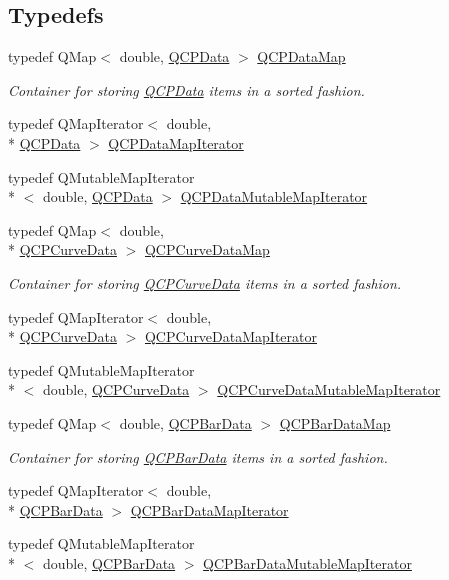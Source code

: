 \subsection*{Typedefs}
\begin{DoxyCompactItemize}
\item 
typedef Q\+Map$<$ double, \hyperlink{a00030_d2/d94/a00184}{Q\+C\+P\+Data} $>$ \hyperlink{a00116_a84a9c4a4c2216ccfdcb5f3067cda76e3}{Q\+C\+P\+Data\+Map}
\begin{DoxyCompactList}\small\item\em Container for storing \hyperlink{a00030_d2/d94/a00184}{Q\+C\+P\+Data} items in a sorted fashion. \end{DoxyCompactList}\item 
typedef Q\+Map\+Iterator$<$ double, \\*
\hyperlink{a00030_d2/d94/a00184}{Q\+C\+P\+Data} $>$ \hyperlink{a00116_a0fd9a83e0a1783a82f439b0e200b6ae5}{Q\+C\+P\+Data\+Map\+Iterator}
\item 
typedef Q\+Mutable\+Map\+Iterator\\*
$<$ double, \hyperlink{a00030_d2/d94/a00184}{Q\+C\+P\+Data} $>$ \hyperlink{a00116_a4798b07422d0d4c46a8665c23958b0ea}{Q\+C\+P\+Data\+Mutable\+Map\+Iterator}
\item 
typedef Q\+Map$<$ double, \\*
\hyperlink{a00029}{Q\+C\+P\+Curve\+Data} $>$ \hyperlink{a00116_a444d37ec9cb2951b3a7fe443c34d1658}{Q\+C\+P\+Curve\+Data\+Map}
\begin{DoxyCompactList}\small\item\em Container for storing \hyperlink{a00029}{Q\+C\+P\+Curve\+Data} items in a sorted fashion. \end{DoxyCompactList}\item 
typedef Q\+Map\+Iterator$<$ double, \\*
\hyperlink{a00029}{Q\+C\+P\+Curve\+Data} $>$ \hyperlink{a00116_aeb3dbc9f09e8ce9957be86dd6e8c803d}{Q\+C\+P\+Curve\+Data\+Map\+Iterator}
\item 
typedef Q\+Mutable\+Map\+Iterator\\*
$<$ double, \hyperlink{a00029}{Q\+C\+P\+Curve\+Data} $>$ \hyperlink{a00116_ad85cf567575500cc8877fd65f4c5b9fb}{Q\+C\+P\+Curve\+Data\+Mutable\+Map\+Iterator}
\item 
typedef Q\+Map$<$ double, \hyperlink{a00026}{Q\+C\+P\+Bar\+Data} $>$ \hyperlink{a00116_aa846c77472cae93def9f1609d0c57191}{Q\+C\+P\+Bar\+Data\+Map}
\begin{DoxyCompactList}\small\item\em Container for storing \hyperlink{a00026}{Q\+C\+P\+Bar\+Data} items in a sorted fashion. \end{DoxyCompactList}\item 
typedef Q\+Map\+Iterator$<$ double, \\*
\hyperlink{a00026}{Q\+C\+P\+Bar\+Data} $>$ \hyperlink{a00116_ad8f7e19ade25016f69f2ebedbd130f92}{Q\+C\+P\+Bar\+Data\+Map\+Iterator}
\item 
typedef Q\+Mutable\+Map\+Iterator\\*
$<$ double, \hyperlink{a00026}{Q\+C\+P\+Bar\+Data} $>$ \hyperlink{a00116_a5f61a38b8bb85ebfefa76ae0983f1c78}{Q\+C\+P\+Bar\+Data\+Mutable\+Map\+Iterator}
\end{DoxyCompactItemize}
